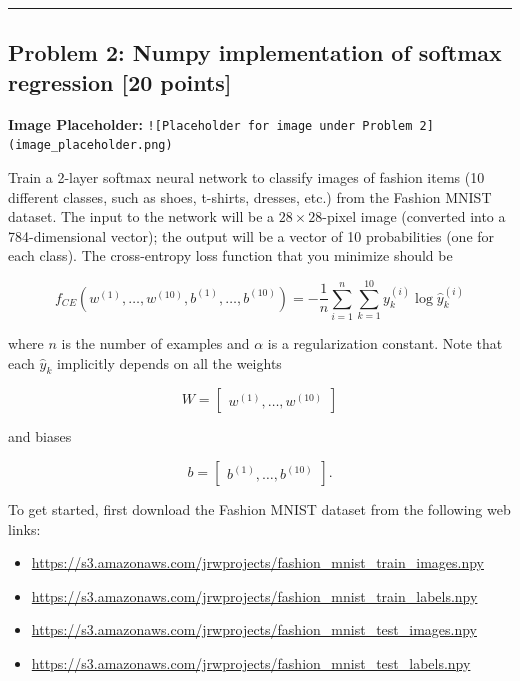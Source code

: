 \documentclass[
  letterpaper,
  DIV=11,
  numbers=noendperiod]{scrartcl}
\providecommand{\tightlist}{%
  \setlength{\itemsep}{0pt}\setlength{\parskip}{0pt}}\usepackage{longtable,booktabs,array}
\begin{document}
\begin{center}\rule{0.5\linewidth}{0.5pt}\end{center}

\subsection{Problem 2: Numpy implementation of softmax regression {[}20
points{]}}\label{problem-2-numpy-implementation-of-softmax-regression-20-points}

\textbf{Image Placeholder:}
\texttt{!{[}Placeholder\ for\ image\ under\ Problem\ 2{]}(image\_placeholder.png)}

Train a 2-layer softmax neural network to classify images of fashion
items (10 different classes, such as shoes, t-shirts, dresses, etc.)
from the Fashion MNIST dataset. The input to the network will be a
\(28 \times 28\)-pixel image (converted into a 784-dimensional vector);
the output will be a vector of 10 probabilities (one for each class).
The cross-entropy loss function that you minimize should be

\[
f_{CE}(w^{(1)}, \ldots, w^{(10)}, b^{(1)}, \ldots, b^{(10)}) = -\frac{1}{n} \sum_{i=1}^n \sum_{k=1}^{10} y_k^{(i)} \log \hat{y}_k^{(i)}
\]

where \(n\) is the number of examples and \(\alpha\) is a regularization
constant. Note that each \(\hat{y}_k\) implicitly depends on all the
weights

\[
W = \begin{bmatrix} w^{(1)}, \ldots, w^{(10)} \end{bmatrix}
\]

and biases

\[
b = \begin{bmatrix} b^{(1)}, \ldots, b^{(10)} \end{bmatrix}.
\]

To get started, first download the Fashion MNIST dataset from the
following web links:

\begin{itemize}
\tightlist
\item
  \url{https://s3.amazonaws.com/jrwprojects/fashion_mnist_train_images.npy}
\item
  \url{https://s3.amazonaws.com/jrwprojects/fashion_mnist_train_labels.npy}
\item
  \url{https://s3.amazonaws.com/jrwprojects/fashion_mnist_test_images.npy}
\item
  \url{https://s3.amazonaws.com/jrwprojects/fashion_mnist_test_labels.npy}
\end{itemize}
\end{document}
